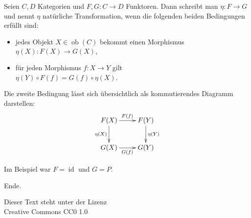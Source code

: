 \documentclass[9pt]{beamer}
\newcommand{\modest}[1]{{\small\color{gray}#1}}
\newcommand{\id}{\operatorname{id}}
\newcommand{\ob}{\operatorname{ob}}
\begin{document}
\begin{frame}
Seien $C,D$ Kategorien und $F,G\colon C\to D$ Funktoren. Dann schreibt
man $\eta\colon F\to G$ und nennt $\eta$ natürliche Transformation,
wenn die folgenden beiden Bedingungen erfüllt sind:
\begin{itemize}
\item jedes Objekt $X\in\ob(C)$ bekommt einen Morphismus\\
  $\eta(X)\colon F(X)\to G(X)$,
\item für jeden Morphismus $f\colon X\to Y$ gilt\\
  $\eta(Y)\circ F(f) = G(f)\circ\eta(X)$.
\end{itemize}
\end{frame}

\begin{frame}
Die zweite Bedingung lässt sich übersichtlich als kommutierendes
Diagramm darstellen:
\[\xymatrix{
F(X) \ar[r]^{F(f)} \ar[d]_{\eta(X)} & F(Y) \ar[d]^{\eta(Y)} \\
G(X) \ar[r]_{G(f)} & G(Y)}\]
\end{frame}

\begin{frame}
Im Beispiel war $F=\id$ und $G=P$.
\end{frame}

\begin{frame}
Ende.

\vfill
\modest{Dieser Text steht unter der Lizenz\\
Creative Commons CC0 1.0}
\end{frame}
\end{document}
